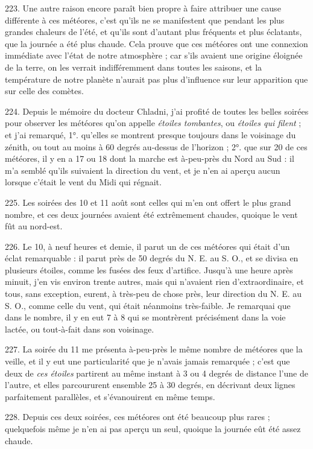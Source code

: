\documentclass[a4paper, 11pt, oneside, polutonikogreek, french]{article}
\begin{document}
223. Une autre raison encore paraît bien propre à faire attribuer une cause différente à ces météores, c'est qu'ils ne se manifestent que pendant les plus grandes chaleurs de l'été, et qu'ils sont d'autant plus fréquents et plus éclatants, que la journée a été plus chaude. Cela prouve que ces météores ont une connexion immédiate avec l'état de notre atmosphère ; car s'ils avaient une origine éloignée de la terre, on les verrait indifféremment dans toutes les saisons, et la température de notre planète n'aurait pas plus d'influence sur leur apparition que sur celle des comètes.

224. Depuis le mémoire du docteur Chladni, j'ai profité de toutes les belles soirées pour observer les météores qu'on appelle \emph{étoiles tombantes}, ou \emph{étoiles qui filent} ; et j'ai remarqué, 1°. qu'elles se montrent presque toujours dans le voisinage du zénith, ou tout au moins à 60 degrés au-dessus de l'horizon ; 2°. que sur 20 de ces météores, il y en a 17 ou 18 dont la marche est à-peu-près du Nord au Sud : il m'a semblé qu'ils suivaient la direction du vent, et je n'en ai aperçu aucun lorsque c'était le vent du Midi qui régnait.

225. Les soirées des 10 et 11 août sont celles qui m'en ont offert le plus grand nombre, et ces deux journées avaient été extrêmement chaudes, quoique le vent fût au nord-est.

226. Le 10, à neuf heures et demie, il parut un de ces météores qui était d'un éclat remarquable : il parut près de 50 degrés du N. E. au S. O., et se divisa en plusieurs étoiles, comme les fusées des feux d'artifice. Jusqu'à une heure après minuit, j'en vis environ trente autres, mais qui n'avaient rien d'extraordinaire, et tous, sans exception, eurent, à très-peu de chose près, leur direction du N. E. au S. O., comme celle du vent, qui était néanmoins très-faible. Je remarquai que dans le nombre, il y en eut 7 à 8 qui se montrèrent précisément dans la voie lactée, ou tout-à-fait dans son voisinage.

227. La soirée du 11 me présenta à-peu-près le même nombre de météores que la veille, et il y eut une particularité que je n'avais jamais remarquée ; c'est que deux de \emph{ces étoiles} partirent au même instant à 3 ou 4 degrés de distance l'une de l'autre, et elles parcoururent ensemble 25 à 30 degrés, en décrivant deux lignes parfaitement parallèles, et s'évanouirent en même temps.

228. Depuis ces deux soirées, ces météores ont été beaucoup plus rares ; quelquefois même je n'en ai pas aperçu un seul, quoique la journée eût été assez chaude.
\end{document}
